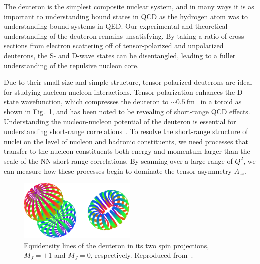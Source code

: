 
The deuteron is the simplest composite nuclear system, and in many ways it is as important to understanding bound states in QCD as the hydrogen atom was to understanding bound systems in QED.  Our experimental and theoretical understanding of the deuteron remains unsatisfying. By taking a ratio of cross sections from electron scattering off of tensor-polarized and unpolarized deuterons, the S- and D-wave states can be disentangled, leading to a fuller understanding of the repulsive nucleon core. 

Due to their small size and simple structure, tensor polarized deuterons are ideal for studying nucleon-nucleon interactions. Tensor polarization enhances the D-state wavefunction, which compresses the deuteron to $\sim0.5\mathrm{~fm}$~\cite{Forest:1996kp} in a toroid as shown in Fig.~\ref{fig:dpol-shape}, and has been noted to be revealing of short-range QCD effects. Understanding the nucleon-nucleon potential of the deuteron is essential for understanding short-range correlations~\cite{Arrington:2011xs}. To resolve the short-range structure of nuclei on the level of nucleon and hadronic constituents, we need processes that transfer to the nucleon constituents both energy and momentum larger than the scale of the NN short-range correlations. By scanning over a large range of $Q^2$, we can measure how these processes begin to dominate the tensor asymmetry $A_{zz}$.





\begin{figure}
\centering
\includegraphics[width=0.5\textwidth]{figs/deuteron_states.eps}
\caption{\label{fig:dpol-shape}
Equidensity lines of the deuteron in its two spin projections, $M_J=\pm 1$ and $M_J=0$, respectively. Reproduced from~\cite{Carlson:1997qn,Forest:1996kp}.
}
\end{figure}

